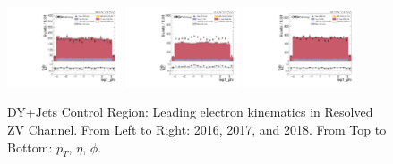 \begin{figure}[!ht]
  \includegraphics[width=0.30\textwidth]{analysis_plots/2016_zjj/cr_vjets_e/lep1_phi.pdf}
  \includegraphics[width=0.30\textwidth]{analysis_plots/2017_zjj/cr_vjets_e/lep1_phi.pdf}
  \includegraphics[width=0.30\textwidth]{analysis_plots/2018_zjj/cr_vjets_e/lep1_phi.pdf} \\
  \caption[DY+Jets Control Region: Leading electron kinematics in Resolved ZV Channel]%
  {DY+Jets Control Region: Leading electron kinematics in Resolved ZV Channel. From Left to Right: 2016,
    2017, and 2018. From Top to Bottom: \( p_T \), \( \eta \), \( \phi \).}%
  \label{fig:zjj-cr-vjets-e-lep1-pt-eta-phi}
\end{figure}

